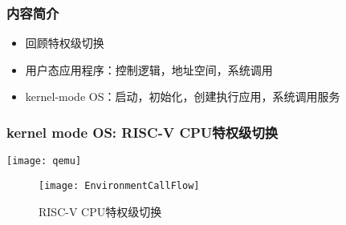 




\begin{frame}
    \frametitle{内容简介}
    \begin{itemize}
        \item 回顾特权级切换
        \item 用户态应用程序：控制逻辑，地址空间，系统调用
        \item kernel-mode OS：启动，初始化，创建执行应用，系统调用服务
    \end{itemize}
\end{frame}

\begin{frame}
	\frametitle{kernel mode OS: RISC-V CPU特权级切换}
	\centering
	\texttt{[image: qemu]}
	
%		
%
\begin{figure}
	\centering
    \texttt{[image: EnvironmentCallFlow]}
    	\caption{RISC-V CPU特权级切换}
    \end{figure}	
\end{frame}

